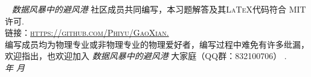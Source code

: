 \documentclass[12pt,a4paper]{ctexbook}
\title{\huge \heiti{高显经典力学习题解答}}
\author{ \ttfamily \texttt \Large 数据风暴中的避风港\\}
\date{\large \today}
\begin{document}
\maketitle

\pagestyle{fancy}
\fancyhf{}
\fancyhead{}
~\vfill
\noindent \textit{数据风暴中的避风港 }\textsc{ 社区成员共同编写，本习题解答及其\LaTeX 代码符合 MIT 许可.}\\

\noindent \textsc{链接：\url{https://github.com/Phiyu/GaoXian.}}\\

\noindent \textsc{编写成员均为物理专业或非物理专业的物理爱好者，编写过程中难免有许多纰漏，欢迎指出，也欢迎加入}
\textit{ 数据风暴中的避风港 } 
\textsc{大家庭（QQ群：832100706） .}\\

\noindent \textit{\number\year 年 \number\month 月} %

\tableofcontents

\newpage
\pagestyle{fancy}
\fancyhf{} 
\fancyhead[LE]{\kaishu \leftmark}
\fancyhead[RO]{\kaishu \leftmark}
\cfoot{\thepage}

\setcounter{page}{1}

\setcounter{problem}{0}
\newpage


\setcounter{problem}{0}
\newpage 


\newpage


\newpage 


\newpage


\newpage 


\newpage


\newpage 


\newpage


\newpage 


\newpage


\newpage 


\newpage


\newpage 


\newpage


\newpage 


\newpage

\end{document}
